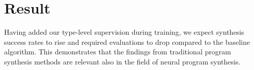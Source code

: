 \documentclass{article}
\begin{document}

\section{Result}

Having added our type-level supervision during training, we expect synthesis success rates to rise and required evaluations to drop compared to the baseline algorithm. This demonstrates that the findings from traditional program synthesis methods are relevant also in the field of neural program synthesis.




\end{document}

